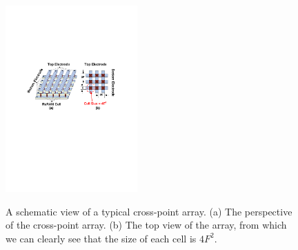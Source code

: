 \begin{figure}
\centering
  \includegraphics[width=0.45\textwidth]{./figures/crossbar_array2.pdf}\\\vspace{-10pt}
  \caption{A schematic view of a typical cross-point array. (a) The perspective of the cross-point array.
  (b) The top view of the array, from which we can clearly see that the size of each cell is $4F^2$. }\label{fig:array}
\vspace{-12pt}
\end{figure}

